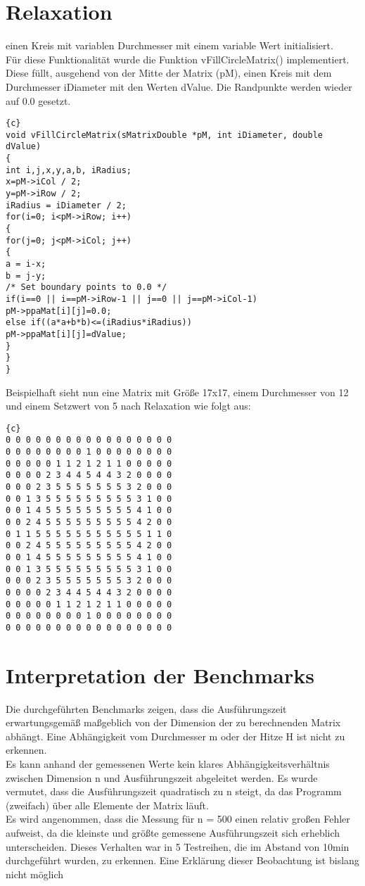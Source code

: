 \documentclass{article}
\newcommand{\enterProblemHeader}[1]{
}
\newcommand{\exitProblemHeader}[1]{
}
\newcounter{homeworkProblemCounter} %
\newcommand{\homeworkProblemName}{}
\newenvironment{homeworkProblem}[1][Problem \arabic{homeworkProblemCounter}]{ %
\stepcounter{homeworkProblemCounter} %
\renewcommand{\homeworkProblemName}{#1} %
\section{\homeworkProblemName} %
}{
}
\begin{document}
\begin{homeworkProblem}[Relaxation]
einen Kreis mit variablen Durchmesser mit einem variable Wert initialisiert.
\\
Für diese Funktionalität wurde die Funktion vFillCircleMatrix() implementiert. Diese
füllt, ausgehend von der Mitte der Matrix (pM), einen Kreis mit dem Durchmesser
iDiameter mit den Werten dValue. Die Randpunkte werden wieder auf 0.0 gesetzt.
\begin{lstlisting}{c}
void vFillCircleMatrix(sMatrixDouble *pM, int iDiameter, double dValue)
{
int i,j,x,y,a,b, iRadius;
x=pM->iCol / 2;
y=pM->iRow / 2;
iRadius = iDiameter / 2;
for(i=0; i<pM->iRow; i++)
{
for(j=0; j<pM->iCol; j++)
{
a = i-x;
b = j-y;
/* Set boundary points to 0.0 */
if(i==0 || i==pM->iRow-1 || j==0 || j==pM->iCol-1)
pM->ppaMat[i][j]=0.0;
else if((a*a+b*b)<=(iRadius*iRadius))
pM->ppaMat[i][j]=dValue;
}
}
}
\end{lstlisting}
Beispielhaft sieht nun eine Matrix mit Größe 17x17, einem Durchmesser von 12 und
einem Setzwert von 5 nach Relaxation wie folgt aus:
\begin{lstlisting}{c}
0 0 0 0 0 0 0 0 0 0 0 0 0 0 0 0 0
0 0 0 0 0 0 0 0 1 0 0 0 0 0 0 0 0
0 0 0 0 0 1 1 2 1 2 1 1 0 0 0 0 0
0 0 0 0 2 3 4 4 5 4 4 3 2 0 0 0 0
0 0 0 2 3 5 5 5 5 5 5 5 3 2 0 0 0
0 0 1 3 5 5 5 5 5 5 5 5 5 3 1 0 0
0 0 1 4 5 5 5 5 5 5 5 5 5 4 1 0 0
0 0 2 4 5 5 5 5 5 5 5 5 5 4 2 0 0
0 1 1 5 5 5 5 5 5 5 5 5 5 5 1 1 0
0 0 2 4 5 5 5 5 5 5 5 5 5 4 2 0 0
0 0 1 4 5 5 5 5 5 5 5 5 5 4 1 0 0
0 0 1 3 5 5 5 5 5 5 5 5 5 3 1 0 0
0 0 0 2 3 5 5 5 5 5 5 5 3 2 0 0 0
0 0 0 0 2 3 4 4 5 4 4 3 2 0 0 0 0
0 0 0 0 0 1 1 2 1 2 1 1 0 0 0 0 0
0 0 0 0 0 0 0 0 1 0 0 0 0 0 0 0 0
0 0 0 0 0 0 0 0 0 0 0 0 0 0 0 0 0
\end{lstlisting}
\end{homeworkProblem}
\pagebreak
\begin{homeworkProblem}[Interpretation der Benchmarks]
Die durchgeführten Benchmarks zeigen, dass die Ausführungszeit erwartungsgemäß maßgeblich von der Dimension der zu berechnenden Matrix abhängt. Eine Abhängigkeit vom Durchmesser m oder der Hitze H ist nicht zu erkennen.\\
Es kann anhand der gemessenen Werte kein klares Abhängigkeitsverhältnis zwischen Dimension n und Ausführungszeit abgeleitet werden. Es wurde vermutet, dass die Ausführungszeit quadratisch zu n steigt, da das Programm (zweifach) über alle Elemente der Matrix läuft.\\
Es wird angenommen, dass die Messung für n = 500 einen relativ großen Fehler aufweist, da die kleinste und größte gemessene Ausführungszeit sich erheblich unterscheiden. Dieses Verhalten war in 5 Testreihen, die im Abstand von 10min durchgeführt wurden, zu erkennen. Eine Erklärung dieser Beobachtung ist bislang nicht möglich
\end{homeworkProblem}
\end{document}
